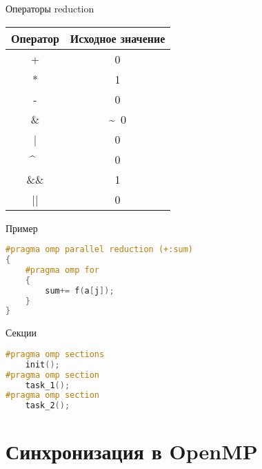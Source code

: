 \begin{frame}{Операторы reduction}
\begin{table}[htpb]
    \centering
    \begin{tabular}{|c|c|}
    \hline
    Оператор    &   Исходное значение   \\
    \hline
    +           &   0                   \\
    \hline
    *           &   1                   \\
    \hline
    -           &   0                   \\
    \hline
    \&          &   \~~0                \\
    \hline
    |           &   0                   \\
    \hline
    \^~         &   0                   \\
    \hline
    \&\&        &   1                   \\
    \hline
    ||          &   0                   \\
    \hline
    \end{tabular}
\end{table}
\end{frame}

\begin{frame}[fragile]{Пример}

\begin{lstlisting}[language=C++,basicstyle=\ttfamily,keywordstyle=\color{blue},basicstyle=\scriptsize]
#pragma omp parallel reduction (+:sum)
{
    #pragma omp for
    {
        sum+= f(a[j]);
    }
}
\end{lstlisting}

\end{frame}

\begin{frame}[fragile]{Секции}

\begin{lstlisting}[language=C++,basicstyle=\ttfamily,keywordstyle=\color{blue},basicstyle=\scriptsize]
#pragma omp sections
    init();
#pragma omp section
    task_1();
#pragma omp section
    task_2();
\end{lstlisting}

\end{frame}

\section{Синхронизация в OpenMP}

